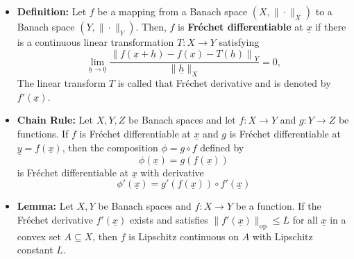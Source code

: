 \documentclass[11pt,twoside]{report}
\newcommand{\bbR}{{\mathbb{R}}}
\newcommand{\vecnot}{\underline}
\begin{document}
\begin{itemize}
\item \textbf{Definition:} Let $f $ be a mapping from a Banach space $(X,\|\cdot\|_X)$ to a Banach space $(Y,\|\cdot\|_Y)$. Then, $f$ is \textbf{Fr\'{e}chet differentiable} at $\vecnot{x}$ if there is a continuous linear transformation $T\colon X \to Y$ satisfying
\begin{equation*} \lim_{\vecnot{h} \to \vecnot{0}} \frac{\left\|f(\vecnot{x}+ \vecnot{h}) - f(\vecnot{x}) - T(\vecnot{h}) \right\|_Y}{\| \vecnot{h} \|_X} = 0,
\end{equation*}
 The linear transform $T$ is called that  Fr\'{e}chet derivative and is denoted by  $f'(\vecnot{x})$.



%
%
%
%
%
%
%

\item \textbf{Chain Rule:}  Let $X,Y,Z$ be Banach spaces and let $f \colon X \rightarrow Y$ and $g\colon Y \to Z$ be functions.
If $f$ is Fr\'{e}chet differentiable at $\vecnot{x}$ and $g$ is Fr\'{e}chet differentiable at $\vecnot{y}=f(\vecnot{x})$, then the composition $\phi = g \circ f$ defined by 
\[
\phi (\vecnot{x}) = g(f(\vecnot{x}))
\]
is Fr\'{e}chet differentiable at $\vecnot{x}$ with derivative
\[
\phi' (\vecnot{x}) =  g'(f(\vecnot{x}))\circ f'(\vecnot{x})
\]


\item \textbf{Lemma:} Let $X,Y$ be Banach spaces and $f \colon X \rightarrow Y$ be a function.
If the Fr\'{e}chet derivative $f'(\vecnot{x})$ exists and satisfies $\| f'(\vecnot{x})\|_{\mathrm{op}} \leq L$ for all $\vecnot{x}$ in a convex set $A\subseteq X$, then $f$ is Lipschitz continuous on $A$ with Lipschitz constant $L$.


\end{itemize}
\end{document}
